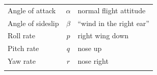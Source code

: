 \documentclass[
]{book}
\begin{document}
\begin{longtable}[]{@{}lcl@{}}
\begin{minipage}[t]{0.56\columnwidth}\raggedright
Angle of attack\strut
\end{minipage} & \begin{minipage}[t]{0.12\columnwidth}\centering
\(\alpha\)\strut
\end{minipage} & \begin{minipage}[t]{0.23\columnwidth}\raggedright
normal flight attitude\strut
\end{minipage}\tabularnewline
\begin{minipage}[t]{0.56\columnwidth}\raggedright
Angle of sideslip\strut
\end{minipage} & \begin{minipage}[t]{0.12\columnwidth}\centering
\(\beta\)\strut
\end{minipage} & \begin{minipage}[t]{0.23\columnwidth}\raggedright
``wind in the right ear''\strut
\end{minipage}\tabularnewline
\begin{minipage}[t]{0.56\columnwidth}\raggedright
Roll rate\strut
\end{minipage} & \begin{minipage}[t]{0.12\columnwidth}\centering
\(p\)\strut
\end{minipage} & \begin{minipage}[t]{0.23\columnwidth}\raggedright
right wing down\strut
\end{minipage}\tabularnewline
\begin{minipage}[t]{0.56\columnwidth}\raggedright
Pitch rate\strut
\end{minipage} & \begin{minipage}[t]{0.12\columnwidth}\centering
\(q\)\strut
\end{minipage} & \begin{minipage}[t]{0.23\columnwidth}\raggedright
nose up\strut
\end{minipage}\tabularnewline
\begin{minipage}[t]{0.56\columnwidth}\raggedright
Yaw rate\strut
\end{minipage} & \begin{minipage}[t]{0.12\columnwidth}\centering
\(r\)\strut
\end{minipage} & \begin{minipage}[t]{0.23\columnwidth}\raggedright
nose right\strut
\end{minipage}\tabularnewline
\begin{minipage}[t]{0.56\columnwidth}\raggedright

\end{minipage}
\end{longtable}
\end{document}
